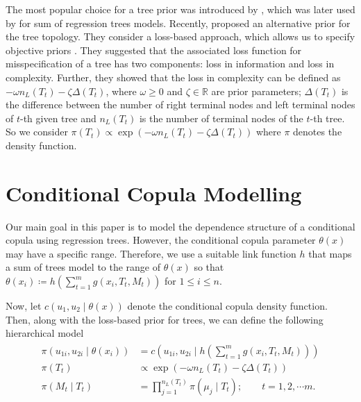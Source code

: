\documentclass[
12pt]{article}
\begin{document}
	The most popular choice for a tree prior was introduced by \citet{chipman98BCART}, which was later used by \citet{chipman2010BART} for sum of regression trees models. Recently, \citet{serafini2024lossbasedpriortreetopologies} proposed an alternative prior for the tree topology. They consider a loss-based approach, which allows us to specify objective priors \citep{villa_loss-prior}. They suggested that the associated loss function for misspecification of a tree has two components: loss in information and loss in complexity. Further, they showed that the loss in complexity can be defined as $-\omega n_L(T_t) - \zeta \Delta(T_t)$, where $\omega\ge 0$ and $\zeta\in\mathbb{R}$ are prior parameters; $\Delta(T_t)$ is the difference between the number of right terminal nodes and left terminal nodes of $t$-th given tree and $n_L(T_t)$ is the number of terminal nodes of the $t$-th tree. So we consider $\pi(T_t) \propto \exp\left(-\omega n_L(T_t) - \zeta \Delta(T_t)\right)$ where $\pi$ denotes the density function.
	
	\section{Conditional Copula Modelling}\label{sec:cond:cop}
	
	Our main goal in this paper is to model the dependence structure of a conditional copula using regression trees. However, the conditional copula parameter $\theta(x)$ may have a specific range. Therefore, we use a suitable link function $h$ that maps a sum of trees model to the range of $\theta(x)$ so that $\theta(x_i) \coloneqq h\left(\sum_{t=1}^m g(x_i, T_t, M_t)\right)$ for $1\le i\le n$. 
	
	Now, let $c\left(u_1,u_2\mid \theta(x)\right)$ denote the conditional copula density function. Then, along with the loss-based prior for trees, we can define the following hierarchical model 
	\begin{align}\label{eq:bayes:hier}
		\begin{split}
			\pi\left(u_{1i},u_{2i} \mid \theta(x_i)\right) & = c\left(u_{1i},u_{2i}\mid h\left(\sum_{t=1}^m g(x_i, T_t, M_t)\right)\right)\\
			\pi(T_t) &\propto \exp\left(-\omega n_L(T_t) - \zeta \Delta(T_t)\right)\\
			\pi(M_t\mid T_t) &= \prod_{j=1}^{n_L(T_t)}\pi(\mu_j\mid T_t); \qquad t = 1,2,\cdots m.
		\end{split}
	\end{align}
	
\end{document}
